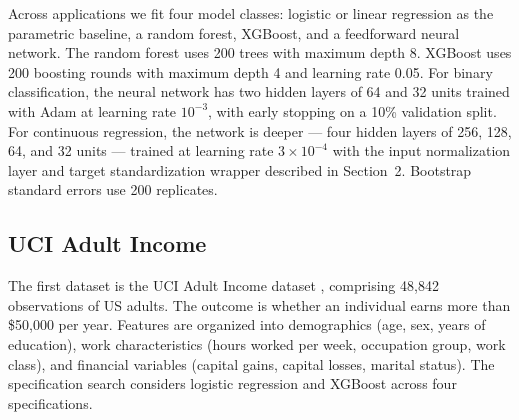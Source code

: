 \documentclass[conference]{IEEEtran}
\begin{document}
	Across applications we fit four model classes: logistic or linear regression as the parametric baseline, a random forest, XGBoost, and a feedforward neural network. The random forest uses 200 trees with maximum depth 8. XGBoost uses 200 boosting rounds with maximum depth 4 and learning rate 0.05. For binary classification, the neural network has two hidden layers of 64 and 32 units trained with Adam at learning rate $10^{-3}$, with early stopping on a 10\% validation split. For continuous regression, the network is deeper --- four hidden layers of 256, 128, 64, and 32 units --- trained at learning rate $3 \times 10^{-4}$ with the input normalization layer and target standardization wrapper described in Section~2. Bootstrap standard errors use 200 replicates.
	
	\subsection{UCI Adult Income}
	
	The first dataset is the UCI Adult Income dataset \cite{UCI, kohavi1996}, comprising 48,842 observations of US adults. The outcome is whether an individual earns more than \$50,000 per year. Features are organized into demographics (age, sex, years of education), work characteristics (hours worked per week, occupation group, work class), and financial variables (capital gains, capital losses, marital status). The specification search considers logistic regression and XGBoost across four specifications.
	
\end{document}
